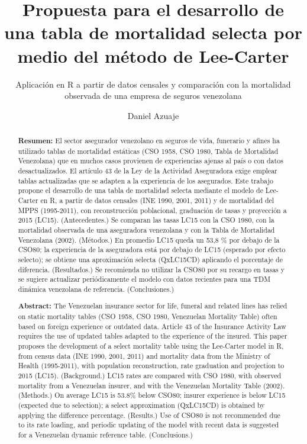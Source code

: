 \documentclass[
  11pt,
  a4paper,
]{article}
\title{Propuesta para el desarrollo de una tabla de mortalidad selecta
por medio del método de Lee-Carter}
\subtitle{Aplicación en R a partir de datos censales y comparación con
la mortalidad observada de una empresa de seguros venezolana}
\author{Daniel Azuaje}
\date{}
\begin{document}
\maketitle
\begin{abstract}
\textbf{Resumen:} El sector asegurador venezolano en seguros de vida,
funerario y afines ha utilizado tablas de mortalidad estáticas (CSO
1958, CSO 1980, Tabla de Mortalidad Venezolana) que en muchos casos
provienen de experiencias ajenas al país o con datos desactualizados. El
artículo 43 de la Ley de la Actividad Aseguradora exige emplear tablas
actualizadas que se adapten a la experiencia de los asegurados. Este
trabajo propone el desarrollo de una tabla de mortalidad selecta
mediante el modelo de Lee-Carter en R, a partir de datos censales (INE
1990, 2001, 2011) y de mortalidad del MPPS (1995-2011), con
reconstrucción poblacional, graduación de tasas y proyección a 2015
(LC15). (Antecedentes.) Se comparan las tasas LC15 con la CSO 1980, con
la mortalidad observada de una aseguradora venezolana y con la Tabla de
Mortalidad Venezolana (2002). (Métodos.) En promedio LC15 queda un 53,8
\% por debajo de la CSO80; la experiencia de la aseguradora está por
debajo de LC15 (esperado por efecto selecto); se obtiene una
aproximación selecta (QxLC15CD) aplicando el porcentaje de diferencia.
(Resultados.) Se recomienda no utilizar la CSO80 por su recargo en tasas
y se sugiere actualizar periódicamente el modelo con datos recientes
para una TDM dinámica venezolana de referencia. (Conclusiones.)

\textbf{Abstract:} The Venezuelan insurance sector for life, funeral and
related lines has relied on static mortality tables (CSO 1958, CSO 1980,
Venezuelan Mortality Table) often based on foreign experience or
outdated data. Article 43 of the Insurance Activity Law requires the use
of updated tables adapted to the experience of the insured. This paper
proposes the development of a select mortality table using the
Lee-Carter model in R, from census data (INE 1990, 2001, 2011) and
mortality data from the Ministry of Health (1995-2011), with population
reconstruction, rate graduation and projection to 2015 (LC15).
(Background.) LC15 rates are compared with CSO 1980, with observed
mortality from a Venezuelan insurer, and with the Venezuelan Mortality
Table (2002). (Methods.) On average LC15 is 53.8\% below CSO80; insurer
experience is below LC15 (expected due to selection); a select
approximation (QxLC15CD) is obtained by applying the difference
percentage. (Results.) Use of CSO80 is not recommended due to its rate
loading, and periodic updating of the model with recent data is
suggested for a Venezuelan dynamic reference table. (Conclusions.)
\end{abstract}
\end{document}
